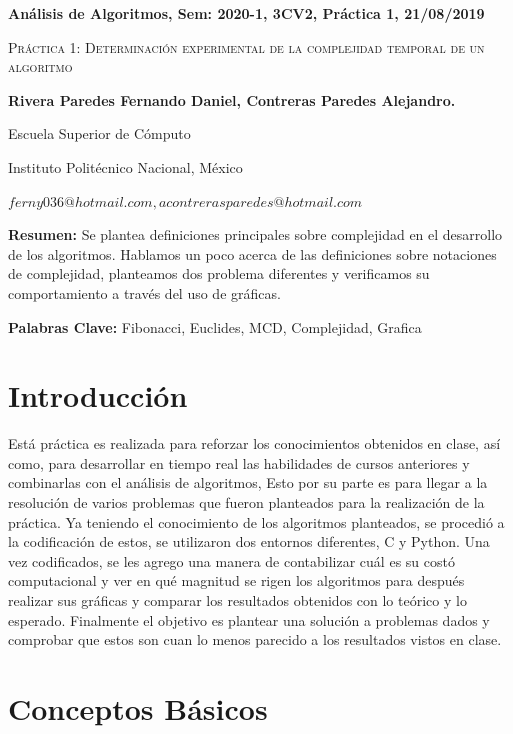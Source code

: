 \documentclass[12pt,twoside]{article}
\date{}
\begin{document}
\centerline{\bf An\'alisis de Algoritmos, Sem: 2020-1, 3CV2, Pr\'actica 1, 21/08/2019 } \centerline{}
\centerline{}
\begin{center}
\Large{\textsc{Pr\'actica 1: Determinaci\'on experimental de la complejidad temporal de un algoritmo}}
\end{center}
\centerline{}
\centerline{\bf {Rivera Paredes Fernando Daniel, Contreras Paredes Alejandro.}}
\centerline{}
\centerline{Escuela Superior de C\'omputo}
\centerline{Instituto Polit\'ecnico Nacional, M\'exico}
\centerline{$ferny036@hotmail.com, acontrerasparedes@hotmail.com$}
\newtheorem{Theorem}{\quad Theorem}[section] \newtheorem{Definition}[Theorem]{\quad Definition} \newtheorem{Corollary}[Theorem]{\quad Corollary} \newtheorem{Lemma}[Theorem]{\quad Lemma} \newtheorem{Example}[Theorem]{\quad Example} \bigskip
\textbf{Resumen:} Se plantea definiciones principales sobre complejidad en el desarrollo de los algoritmos. Hablamos un poco acerca de las definiciones sobre
notaciones de complejidad, planteamos dos problema diferentes y verificamos su comportamiento a trav\'es del uso de gr\'aficas.

\centerline{}
{\bf Palabras Clave:} Fibonacci, Euclides, MCD, Complejidad, Grafica
\newpage
\section{Introducci\'on}
Está práctica es realizada para reforzar los conocimientos obtenidos en clase, así como, para desarrollar en tiempo real las 
habilidades de cursos anteriores y combinarlas con el análisis de algoritmos, Esto por su parte es para llegar a la resolución de varios 
problemas que fueron planteados para la realización de la práctica.
Ya teniendo el conocimiento de los algoritmos planteados, se procedió a la codificación de estos, se utilizaron dos entornos diferentes,
C y Python.
Una vez codificados, se les agrego una manera de contabilizar cuál es su costó computacional y ver en qué magnitud se rigen los 
algoritmos para después realizar sus gráficas y comparar los resultados obtenidos con lo teórico y lo esperado.
Finalmente el objetivo es plantear una solución a problemas dados y comprobar que estos son cuan lo menos parecido a los resultados vistos en clase.
\section{Conceptos B\'asicos} 
\end{document}
